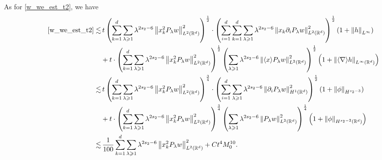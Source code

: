 \documentclass[10pt,twoside,a4paper]{article}
\numberwithin{equation}{section}\allowdisplaybreaks
\def\geq{\geqslant}
\begin{document}
	As for \eqref{w_we_est_t2}, we have
	\begin{align*}
		\eqref{w_we_est_t2} \lesssim & \, t   \left(\sum_{k=1}^d  \sum_{\lambda \geq 1} \lambda^{2 s_2-6 } \left\| x_k^2 P_{\lambda }  w\right\|_{L^{2}(\mathbb{R}^d)}^2\right)^{\frac 12}  \cdot \left( \sum_{i=1}^d \sum_{k=1}^d  \sum_{\lambda \geq 1} \lambda^{2 s_2-6 } \left\|x_k \partial_i P_{\lambda }  w \right\|_{L^{2}(\mathbb{R}^d)}^2 \right)^{\frac 12}\left(1+ \left\|h\right\|_{L^\infty } \right)\\
		&+t \cdot   \left(\sum_{k=1}^d  \sum_{\lambda \geq 1} \lambda^{2 s_2-6 } \left\| x_k^2 P_{\lambda }  w\right\|_{L^{2}(\mathbb{R}^d)}^2\right)^{\frac 12}   \left(    \sum_{\lambda \geq 1} \lambda^{2 s_2-6 } \left\| \langle x \rangle  P_{\lambda }  w \right\|_{L^{2}(\mathbb{R}^d)}^2 \right)^{\frac 12} \left( 1+\left\| \langle \nabla \rangle  h  \right\|_{L^{\infty}(\mathbb{R}^d)}\right)\\
		\lesssim & \, t   \left(\sum_{k=1}^d  \sum_{\lambda \geq 1} \lambda^{2 s_2-6 } \left\| x_k^2 P_{\lambda }  w\right\|_{L^{2}(\mathbb{R}^d)}^2\right)^{\frac 34}  \cdot \left( \sum_{i=1}^d   \sum_{\lambda \geq 1} \lambda^{2 s_2-6 } \left\|  \partial_i P_{\lambda }  w \right\|_{H^{1}(\mathbb{R}^d)}^2 \right)^{\frac 12}\left(1+ \left\|\phi \right\|_{H^{s_2 -3} } \right)\\
		&+t \cdot   \left(\sum_{k=1}^d  \sum_{\lambda \geq 1} \lambda^{2 s_2-6 } \left\| x_k^2 P_{\lambda }  w\right\|_{L^{2}(\mathbb{R}^d)}^2\right)^{\frac 34}   \left(    \sum_{\lambda \geq 1} \lambda^{2 s_2-6 } \left\|   P_{\lambda }  w \right\|_{L^{2}(\mathbb{R}^d)}^2 \right)^{\frac 14} \left( 1+\left\|     \phi  \right\|_{H^{s_2-2}(\mathbb{R}^d)}\right)\\
		\lesssim	& \,   \frac{1}{100} \sum_{k=1}^d  \sum_{\lambda \geq 1} \lambda^{2 s_2-6 } \left\| x_k^2 P_{\lambda }  w\right\|_{L^{2}(\mathbb{R}^d)}^2 +Ct^4 M_0^{10}. 
	\end{align*}
	
\end{document}
